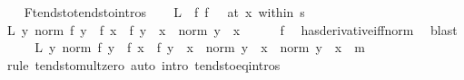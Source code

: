\begin{isabellebody}
\ \ \isamarkupfalse%
\ F{\isachardot}{\kern0pt}tendsto{\isacharbrackleft}{\kern0pt}tendsto{\isacharunderscore}{\kern0pt}intros{\isacharbrackright}{\kern0pt}\isanewline
\ \ \isamarkupfalse%
\ {\isacharquery}{\kern0pt}L\ {\isacharequal}{\kern0pt}\ {\isachardoublequoteopen}{\isasymlambda}f{\isachardot}{\kern0pt}\ {\isacharparenleft}{\kern0pt}f\ {\isasymlonglongrightarrow}\ {}{\isacharparenright}{\kern0pt}\ {\isacharparenleft}{\kern0pt}at\ x\ within\ s{\isacharparenright}{\kern0pt}{\isachardoublequoteclose}\isanewline
\ \ \isamarkupfalse%
\ {\isachardoublequoteopen}{\isacharquery}{\kern0pt}L\ {\isacharparenleft}{\kern0pt}{\isasymlambda}y{\isachardot}{\kern0pt}\ norm\ {\isacharparenleft}{\kern0pt}{\isacharparenleft}{\kern0pt}f\ y\ {\isacharminus}{\kern0pt}\ f\ x{\isacharparenright}{\kern0pt}\ {\isacharminus}{\kern0pt}\ f{\isacharprime}{\kern0pt}\ {\isacharparenleft}{\kern0pt}y\ {\isacharminus}{\kern0pt}\ x{\isacharparenright}{\kern0pt}{\isacharparenright}{\kern0pt}\ {\isacharslash}{\kern0pt}\ norm\ {\isacharparenleft}{\kern0pt}y\ {\isacharminus}{\kern0pt}\ x{\isacharparenright}{\kern0pt}{\isacharparenright}{\kern0pt}{\isachardoublequoteclose}\isanewline
\ \ \ \ \isamarkupfalse%
\ f\ \isamarkupfalse%
\ has{\isacharunderscore}{\kern0pt}derivative{\isacharunderscore}{\kern0pt}iff{\isacharunderscore}{\kern0pt}norm\ \isamarkupfalse%
\ blast\isanewline
\ \ \isamarkupfalse%
\ \isamarkupfalse%
\ {\isachardoublequoteopen}{\isacharquery}{\kern0pt}L\ {\isacharparenleft}{\kern0pt}{\isasymlambda}y{\isachardot}{\kern0pt}\ norm\ {\isacharparenleft}{\kern0pt}{\isacharparenleft}{\kern0pt}f\ y\ {\isacharminus}{\kern0pt}\ f\ x{\isacharparenright}{\kern0pt}\ {\isacharminus}{\kern0pt}\ f{\isacharprime}{\kern0pt}\ {\isacharparenleft}{\kern0pt}y\ {\isacharminus}{\kern0pt}\ x{\isacharparenright}{\kern0pt}{\isacharparenright}{\kern0pt}\ {\isacharslash}{\kern0pt}\ norm\ {\isacharparenleft}{\kern0pt}y\ {\isacharminus}{\kern0pt}\ x{\isacharparenright}{\kern0pt}\ {\isacharasterisk}{\kern0pt}\ norm\ {\isacharparenleft}{\kern0pt}y\ {\isacharminus}{\kern0pt}\ x{\isacharparenright}{\kern0pt}{\isacharparenright}{\kern0pt}{\isachardoublequoteclose}\ {\isacharparenleft}{\kern0pt}\ {\isacharquery}{\kern0pt}m{\isacharparenright}{\kern0pt}\isanewline
\ \ \ \ \isamarkupfalse%
\ {\isacharparenleft}{\kern0pt}rule\ tendsto{\isacharunderscore}{\kern0pt}mult{\isacharunderscore}{\kern0pt}zero{\isacharparenright}{\kern0pt}\ {\isacharparenleft}{\kern0pt}auto\ intro{\isacharbang}{\kern0pt}{\isacharcolon}{\kern0pt}\ tendsto{\isacharunderscore}{\kern0pt}eq{\isacharunderscore}{\kern0pt}intros{\isacharparenright}{\kern0pt}\isanewline

\end{isabellebody}
